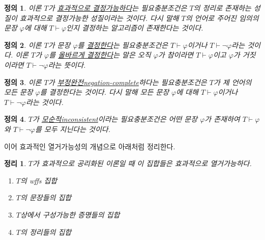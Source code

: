 \documentclass[a4paper,chapter,atbegshi]{oblivoir}
\newtheorem{defn}{정의}[chapter]
\newtheorem{theo}{정리}[chapter]
\begin{document}
\begin{defn}\label{defn:18}
  이론 $T$가 \underline{효과적으로 결정가능하다}는 필요충분조건은 $T$의 정리로
  존재하는 성질이 효과적으로 결정가능한 성질이라는 것이다. 다시 말해
  $T$의 언어로 주어진 임의의 문장 $\varphi$에 대해 $T\vdash\varphi$인지 결정하는
  알고리즘이 존재한다는 것이다.
\end{defn}
\begin{defn}\label{defn:19}
  이론 $T$가 문장 $\varphi$를 \underline{결정한다}는 필요충분조건은 
  $T\vdash\varphi$이거나 $T\vdash\neg\varphi$라는 것이다. 이론 $T$가
  $\varphi$를 \underline{올바르게 결정한다}는 말은 오직 $\varphi$가 참이라면
  $T\vdash\varphi$이고 $\varphi$가 거짓이라면 $T\vdash\neg\varphi$라는 뜻이다.
\end{defn}
\begin{defn}\label{defn:110}
  이론 $T$가 \underline{부정완전\tiny negation-complete}하다는 필요충분조건은
  $T$가 제 언어의 모든 문장 $\varphi$를 결정한다는 것이다. 다시 말해 모든 문장
  $\varphi$에 대해 $T\vdash\varphi$이거나 $T\vdash\neg\varphi$라는 것이다.
\end{defn}
\begin{defn}\label{defn:111}
  $T$가 \underline{모순적\tiny inconsistent}이라는 필요충분조건은 어떤 문장
  $\varphi$가 존재하여 $T\vdash\varphi$와 $T\vdash\neg\varphi$를 모두 지닌다는
  것이다.
\end{defn}
이어 효과적인 열거가능성의 개념으로 아래처럼 정리한다.
\begin{theo}\label{theo:112}
  $T$가 효과적으로 공리화된 이론일 때 이 집합들은 효과적으로 열거가능하다.
  \begin{enumerate}
    \item $T$의 wffs 집합
    \item $T$의 문장들의 집합
    \item $T$상에서 구성가능한 증명들의 집합
    \item $T$의 정리들의 집합 
  \end{enumerate}
\end{theo}
\end{document}
